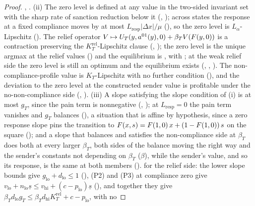 \begin{proof}
, .
(ii) The zero level is defined at any value in the two-sided invariant set with the sharp
rate of sanction reduction below it (, );
across states the response at a fixed compliance moves by at most
$L_{\mathrm{resp}}|\Delta x|/\mu$ (), so the zero
level is $L_\alpha$-Lipschitz (). The relief
operator $V\mapsto U_T(y,a^{01}(y),0)+\beta_TV(F(y,0))$ is a contraction
preserving the $K_T^{\mathrm{rel}}$-Lipschitz clause (,
); the zero level is the unique argmax at the relief
values () and the equilibrium is
, with ; at
the weak relief side the zero level is still an optimum and the equilibrium
exists (, ,
). The
non-compliance-profile value is $K_T$-Lipschitz with no further condition
(), and the deviation to the zero level at the
constructed sender value is profitable under the no-non-compliance side
(,
).
(iii) A slope satisfying the slope condition of (i) is at most $g_T$, since
the pain term is nonnegative (,
); at $L_{\mathrm{resp}}=0$ the pain term
vanishes and $g_T$ balances (), a situation that
is affine by hypothesis, since a zero response slope pins the transition to
$F(x,s)=F(1,0)\,x+(1-F(1,0))\,s$ on the square
(); and a slope
that balances and satisfies the non-compliance side at $\beta_T$ does both at every
larger $\beta_T$, both sides of the balance moving the right way and the
sender's constants not depending on $\beta_T$
($\beta$), while the sender's value, and so
its response, is the same at both members ().  for the relief side: the lower
slope bounds give $g_{\mathrm{lo}}+d_{\mathrm{lo}}\le1$ (), (P2)
and (P3) at compliance zero give
$v_{\mathrm{lo}}+n_{\mathrm{lo}}\underline s\le v_{\mathrm{hi}}+(c-p_{\mathrm{lo}})\underline s$
(), and together they give
$\beta_Td_{\mathrm{lo}}g_T\le\beta_Td_{\mathrm{hi}}K_T^{\mathrm{rel}}+c-p_{\mathrm{lo}}$, with no

\end{proof}
